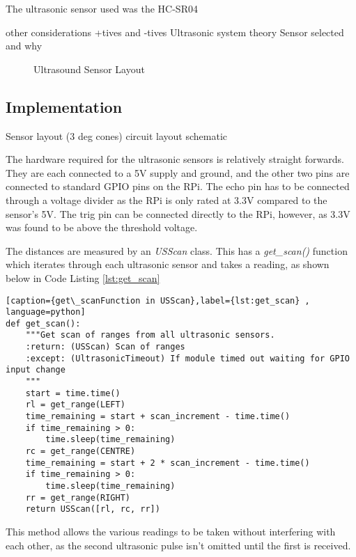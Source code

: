The ultrasonic sensor used was the HC-SR04

other considerations +tives and -tives
Ultrasonic system theory
Sensor selected and why


\begin{figure}[!ht]
	\centering
	\caption{Ultrasound Sensor Layout}\label{UltraSoundSensorDiagram}

\end{figure}

\subsection{Implementation}\label{elec/range/impl}
Sensor layout (3 deg cones) 
circuit layout
schematic

The hardware required for the ultrasonic sensors is relatively straight forwards. They are each connected to a 5V supply and ground, and the other two pins are connected to standard GPIO pins on the RPi. The echo pin has to be connected through a voltage divider as the RPi is only rated at 3.3V compared to the sensor's 5V. The trig pin can be connected directly to the RPi, however, as 3.3V was found to be above the threshold voltage.

The distances are measured by an \textit{USScan} class. This has a \textit{get\_scan()} function which iterates through each ultrasonic sensor and takes a reading, as shown below in Code Listing \ref{lst:get_scan}

\begin{lstlisting}[caption={get\_scanFunction in USScan},label={lst:get_scan} , language=python]
def get_scan():
    """Get scan of ranges from all ultrasonic sensors.
    :return: (USScan) Scan of ranges
    :except: (UltrasonicTimeout) If module timed out waiting for GPIO input change
    """
    start = time.time()
    rl = get_range(LEFT)
    time_remaining = start + scan_increment - time.time()
    if time_remaining > 0:
        time.sleep(time_remaining)
    rc = get_range(CENTRE)
    time_remaining = start + 2 * scan_increment - time.time()
    if time_remaining > 0:
        time.sleep(time_remaining)
    rr = get_range(RIGHT)
    return USScan([rl, rc, rr])
\end{lstlisting}

This method allows the various readings to be taken without interfering with each other, as the second ultrasonic pulse isn't omitted until the first is received. 

